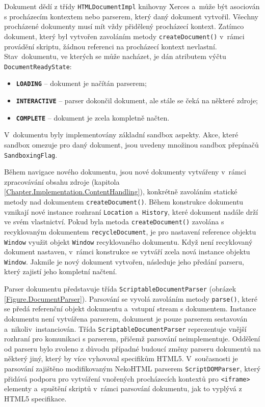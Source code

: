Dokument dědí z třídy \texttt{HTMLDocumentImpl} knihovny Xerces a~může být asociován s procházecím kontextem nebo parserem, který daný dokument vytvořil. Všechny procházené dokumenty musí mít vždy přidělený procházecí kontext. Zatímco dokument, který byl vytvořen zavoláním metody \texttt{createDocument()} v~rámci provádění skriptu, žádnou referenci na procházecí kontext nevlastní. Stav~dokumentu, ve kterých se může nacházet, je dán atributem výčtu \texttt{DocumentReadyState}:

\begin{itemize}
  \item \textbf{\texttt{LOADING}} -- dokument je načítán parserem;
  \item \textbf{\texttt{INTERACTIVE}} -- parser dokončil dokument, ale stále se čeká na některé zdroje;
  \item \textbf{\texttt{COMPLETE}} -- dokument je zcela kompletně načten.
\end{itemize}

V~dokumentu byly implementovány základní sandbox aspekty. Akce, které sandbox omezuje pro daný dokument, jsou uvedeny množinou sandbox přepínačů \texttt{SandboxingFlag}. 

Během navigace nového dokumentu, jsou nové dokumenty vytvářeny v~rámci zpracovávání obsahu zdroje (kapitola \ref{Chapter.Implementation.ContentHandling}), konkrétně zavoláním statické metody nad dokumentem \texttt{createDocument()}. Během konstrukce dokumentu vznikají nové instance rozhraní \texttt{Location} a~\texttt{History}, které dokument nadále drží ve svém vlastnictví. Pokud byla metoda \texttt{createDocument()} zavolána s recyklovaným dokumentem \texttt{recycleDocument}, je pro nastavení reference objektu \texttt{Window} využit objekt \texttt{Window} recyklovaného dokumentu. Když není recyklovaný dokument nastaven, v~rámci konstrukce se vytváří zcela nová instance objektu \texttt{Window}. Jakmile je nový dokument vytvořen, následuje jeho předání parseru, který zajistí jeho kompletní načtení.

Parser dokumentu představuje třída \texttt{ScriptableDocumentParser} (obrázek \ref{Figure.DocumentParser}). Parsování se vyvolá zavoláním metody \texttt{parse()}, které se předá referenční objekt dokumentu a~vstupní stream s dokumentem. Instance dokumentu není vytvářena parserem, dokument je pouze parserem sestavován a~nikoliv~instanciován. Třída \texttt{ScriptableDocumentParser} reprezentuje vnější rozhraní pro komunikaci s parserem, přičemž parsování neimplementuje. Oddělení od parseru bylo zvoleno z důvodu případné budoucí změny parseru dokumentů na některý jiný, který by více vyhovoval specifikům HTML5. V~současnosti je parsování zajištěno modifikovaným NekoHTML parserem \texttt{ScriptDOMParser}, který přidává podporu pro vytváření vnořených procházecích kontextů pro \texttt{<iframe>} elementy a~spuštění skriptů v~rámci parsování dokumentu, jak to vyplývá z HTML5 specifikace. 

